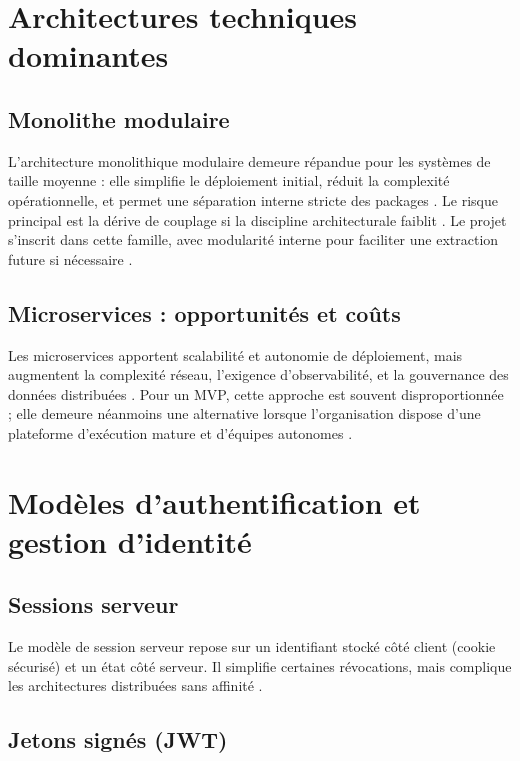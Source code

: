 \newpage
\section{Architectures techniques dominantes}

\subsection{Monolithe modulaire}

L'architecture monolithique modulaire demeure répandue pour les systèmes de taille moyenne : elle simplifie le déploiement initial, réduit la complexité opérationnelle, et permet une séparation interne stricte des packages \cite{bass2021}. Le risque principal est la dérive de couplage si la discipline architecturale faiblit \cite{fowler2002}. Le projet s'inscrit dans cette famille, avec modularité interne pour faciliter une extraction future si nécessaire \cite{newman2021}.

\subsection{Microservices : opportunités et coûts}

Les microservices apportent scalabilité et autonomie de déploiement, mais augmentent la complexité réseau, l'exigence d'observabilité, et la gouvernance des données distribuées \cite{newman2021,kleppmann2017}. Pour un MVP, cette approche est souvent disproportionnée ; elle demeure néanmoins une alternative lorsque l'organisation dispose d'une plateforme d'exécution mature et d'équipes autonomes \cite{bass2021}.

\section{Modèles d'authentification et gestion d'identité}

\subsection{Sessions serveur}

Le modèle de session serveur repose sur un identifiant stocké côté client (cookie sécurisé) et un état côté serveur. Il simplifie certaines révocations, mais complique les architectures distribuées sans affinité \cite{owasp2021}.

\subsection{Jetons signés (JWT)}

